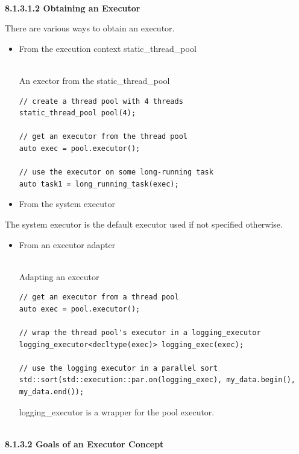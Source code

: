 \hspace*{\fill} \\ %
\noindent
\textbf{8.1.3.1.2\hspace{0.2cm} Obtaining an Executor}

There are various ways to obtain an executor.

\begin{itemize}
\item 
From the execution context static\_thread\_pool

\hspace*{\fill} \\ %
\noindent
An exector from the static\_thread\_pool
\begin{lstlisting}[style=styleCXX]
// create a thread pool with 4 threads
static_thread_pool pool(4);

// get an executor from the thread pool
auto exec = pool.executor();

// use the executor on some long-running task
auto task1 = long_running_task(exec);
\end{lstlisting}

\item 
From the system executor
\end{itemize}

The system executor is the default executor used if not specified otherwise.

\begin{itemize}
\item 
From an executor adapter

\hspace*{\fill} \\ %
\noindent
Adapting an executor
\begin{lstlisting}[style=styleCXX]
// get an executor from a thread pool
auto exec = pool.executor();

// wrap the thread pool's executor in a logging_executor
logging_executor<decltype(exec)> logging_exec(exec);

// use the logging executor in a parallel sort
std::sort(std::execution::par.on(logging_exec), my_data.begin(), my_data.end());
\end{lstlisting}

logging\_executor is a wrapper for the pool executor.
\end{itemize}

\hspace*{\fill} \\ %
\noindent
\textbf{8.1.3.2\hspace{0.2cm} Goals of an Executor Concept}

